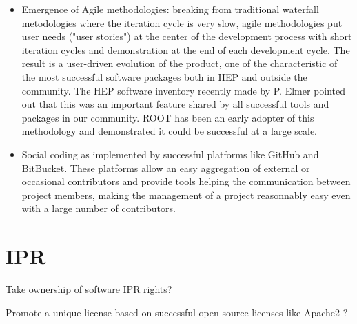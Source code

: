 \documentclass[11pt]{article} %
\begin{document}
\begin{itemize}
\item 
Emergence of Agile methodologies: breaking from traditional
waterfall metodologies where the iteration cycle is very slow, agile
methodologies put user needs ("user stories") at the center of the
development process with short iteration cycles and demonstration
at the end of each development cycle.
The result is a user-driven evolution of the product, one of the
characteristic of the most successful software packages both in HEP
and outside the community. 
The HEP software inventory recently made by P. Elmer pointed out that
this was an important feature shared by all successful tools and
packages in our community.
ROOT has been an early adopter of this methodology and demonstrated
it could be successful at a large scale.

\item 
Social coding as implemented by successful platforms like GitHub and
BitBucket.
These platforms allow an easy aggregation of external or occasional
contributors and provide tools helping the communication between
project members, making the management of a project reasonnably
easy even with a large number of contributors.



\end{itemize}


\section{IPR}

Take ownership of software IPR rights?

Promote a unique license based on successful open-source licenses like
Apache2 ?
\end{document}
